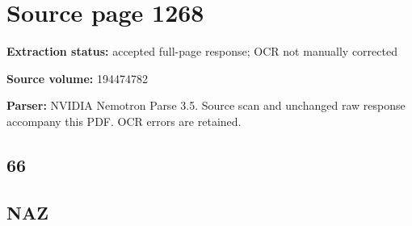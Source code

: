 \clearpage
\section{Source page 1268}
\textbf{Extraction status:} accepted full-page response; OCR not manually corrected\par
\textbf{Source volume:} 194474782\par
\textbf{Parser:} NVIDIA Nemotron Parse 3.5. Source scan and unchanged raw response accompany this PDF. OCR errors are retained.\par\medskip
\subsection*{66}
\subsection*{NAZ}
